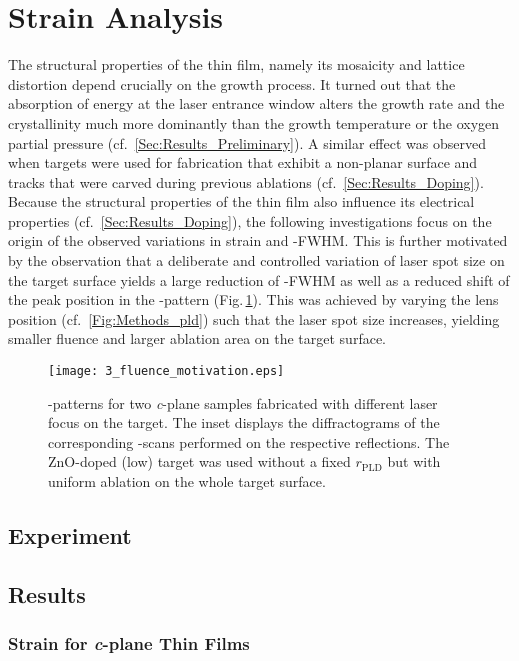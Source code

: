 \section{Strain Analysis}
    \label{Sec:Results_Energy}
The structural properties of the thin film, namely its mosaicity and lattice distortion depend crucially on the growth process.
It turned out that the absorption of energy at the laser entrance window alters the growth rate and the crystallinity much more dominantly than the growth temperature or the oxygen partial pressure (cf.\ \ref{Sec:Results_Preliminary}).
A similar effect was observed when targets were used for fabrication that exhibit a non-planar surface and tracks that were carved during previous ablations (cf.\ \ref{Sec:Results_Doping}).
Because the structural properties of the thin film also influence its electrical properties (cf.\ \ref{Sec:Results_Doping}), the following investigations focus on the origin of the observed variations in strain and \textomega-FWHM.
This is further motivated by the observation that a deliberate and controlled variation of laser spot size on the target surface yields a large reduction of \textomega-FWHM as well as a reduced shift of the peak position in the \thetaomega-pattern (Fig.\,\ref{Fig:Results_3_motivation}).
This was achieved by varying the lens position (cf.\ \ref{Fig:Methods_pld}) such that the laser spot size increases, yielding smaller fluence and larger ablation area on the target surface.
\begin{figure}[h]
    \centering
    \texttt{[image: 3\_fluence\_motivation.eps]}
    \caption{
    \thetaomega-patterns for two \textit{c}-plane samples fabricated with different laser focus on the target.
    The inset displays the diffractograms of the corresponding \textomega-scans performed on the respective reflections.
    The ZnO-doped (low) target was used without a fixed $r_\mathrm{PLD}$ but with uniform ablation on the whole target surface.
    }
    \label{Fig:Results_3_motivation}
\end{figure}

\subsection{Experiment}
    
\subsection{Results}
    
        \subsubsection{Strain for \textit{c}-plane Thin Films}
            
